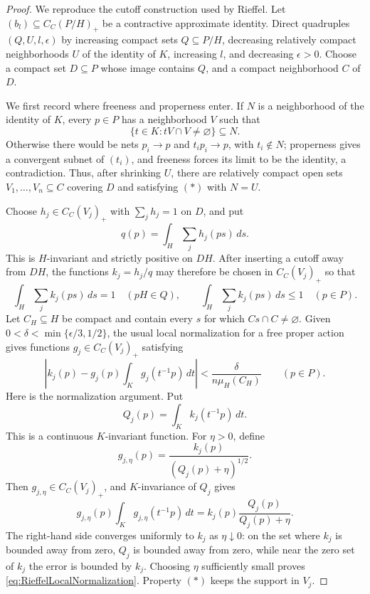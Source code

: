 \documentclass{book}
\begin{document}
\begin{proof}
  We reproduce the cutoff construction used by Rieffel.  Let
  \((b_l)\subseteq C_C(P/H)_+\) be a contractive approximate identity.
  Direct quadruples \((Q,U,l,\epsilon)\) by increasing compact sets
  \(Q\subseteq P/H\), decreasing relatively compact neighborhoods \(U\) of
  the identity of \(K\), increasing \(l\), and decreasing \(\epsilon>0\).
  Choose a compact set \(D\subseteq P\) whose image contains \(Q\), and a
  compact neighborhood \(C\) of \(D\).

  We first record where freeness and properness enter.  If \(N\) is a
  neighborhood of the identity of \(K\), every \(p\in P\) has a neighborhood
  \(V\) such that
  \[
    \{t\in K:tV\cap V\ne\varnothing\}\subseteq N.
    \tag{\(*\)}
  \]
  Otherwise there would be nets \(p_i\to p\) and \(t_i p_i\to p\), with
  \(t_i\notin N\); properness gives a convergent subnet of \((t_i)\), and
  freeness forces its limit to be the identity, a contradiction.
  Thus, after shrinking \(U\), there are relatively compact open sets
  \(V_1,\ldots,V_n\subseteq C\) covering \(D\) and satisfying \((*)\) with
  \(N=U\).

  Choose \(h_j\in C_C(V_j)_+\) with \(\sum_jh_j=1\) on \(D\), and put
  \[
    q(p)=\int_H\sum_jh_j(ps)\,ds.
  \]
  This is \(H\)-invariant and strictly positive on \(DH\).  After inserting
  a cutoff away from \(DH\), the functions
  \(k_j=h_j/q\) may therefore be chosen in \(C_C(V_j)_+\) so that
  \begin{equation}\label{eq:RieffelCutoff}
    \int_H\sum_jk_j(ps)\,ds=1\quad(pH\in Q),
    \qquad
    \int_H\sum_jk_j(ps)\,ds\leq1\quad(p\in P).
  \end{equation}
  Let \(C_H\subseteq H\) be compact and contain every \(s\) for which
  \(Cs\cap C\ne\varnothing\).  Given
  \(0<\delta<\min\{\epsilon/3,1/2\}\), the usual local normalization for a
  free proper action gives functions \(g_j\in C_C(V_j)_+\) satisfying
  \begin{equation}\label{eq:RieffelLocalNormalization}
    \left|k_j(p)-g_j(p)\int_Kg_j(t^{-1}p)\,dt\right|
       <\frac{\delta}{n\mu_H(C_H)}
       \qquad(p\in P).
  \end{equation}
  Here is the normalization argument.  Put
  \[
    Q_j(p)=\int_Kk_j(t^{-1}p)\,dt.
  \]
  This is a continuous \(K\)-invariant function.  For \(\eta>0\), define
  \[
    g_{j,\eta}(p)=\frac{k_j(p)}{(Q_j(p)+\eta)^{1/2}}.
  \]
  Then \(g_{j,\eta}\in C_C(V_j)_+\), and \(K\)-invariance of \(Q_j\) gives
  \[
    g_{j,\eta}(p)\int_Kg_{j,\eta}(t^{-1}p)\,dt
      =k_j(p)\frac{Q_j(p)}{Q_j(p)+\eta}.
  \]
  The right-hand side converges uniformly to \(k_j\) as \(\eta\downarrow0\):
  on the set where \(k_j\) is bounded away from zero, \(Q_j\) is bounded
  away from zero, while near the zero set of \(k_j\) the error is bounded
  by \(k_j\).  Choosing \(\eta\) sufficiently small proves
  \eqref{eq:RieffelLocalNormalization}.  Property \((*)\) keeps the support
  in \(V_j\).


\end{proof}
\end{document}
